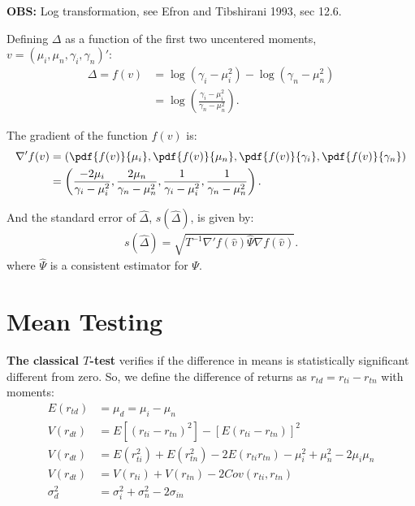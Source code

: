 \documentclass[12pt,oneside,a4paper]{article}
\begin{document}
\noindent
{\footnotesize
\textbf{OBS:} Log transformation, see Efron and Tibshirani 1993, sec 12.6.}
\vspace{1 em}

Defining $\Delta$ as a function of the first two uncentered moments, $v = (\mu_{i}, \mu_{n}, \gamma_{i}, \gamma_{n})'$:
\begin{align*}
\Delta = f(v) &=
\log{(\gamma_{i} - \mu^2_{i})} - \log{(\gamma_{n} - \mu^2_{n})} \\ &=
\log\left( {\frac{\gamma_{i} - \mu^2_{i}}{\gamma_{n} - \mu^2_{n}}} \right).
\end{align*}

The gradient of the function $f(v)$ is:
\begin{align}
\nabla' f(v) &=
\left( 
\pdf{f(v)}{\mu_{i}},
\pdf{f(v)}{\mu_{n}},
\pdf{f(v)}{\gamma_{i}},
\pdf{f(v)}{\gamma_{n}}
\right)
\\ &=
\left( 
\frac{-2 \mu_{i}}{\gamma_{i} - \mu_{i}^2},
\frac{2 \mu_{n}}{\gamma_{n} - \mu_{n}^2},
\frac{1}{\gamma_{i} - \mu_{i}^2},  
\frac{1}{\gamma_{n} - \mu_{n}^2}
\right).
\end{align}

And the standard error of $\hat{\Delta}$, $s(\hat{\Delta})$, is given by:
\begin{align}
	s(\hat{\Delta}) = \sqrt{T^{-1} \nabla'f(\hat{v}) \hat{\Psi} \nabla f(\hat{v})}.
\end{align}
where $\hat{\Psi}$ is a consistent estimator for $\Psi$.



\clearpage
\section{Mean Testing}

\textbf{The classical $T$-test} 
verifies if the difference in means is statistically significant different from zero.
So, we define the difference of returns as $r_{td} = r_{ti} - r_{tn}$ with moments:
\begin{align*}
E(r_{td}) &= \mu_{d} = \mu_{i} - \mu_{n} 
	\\
V(r_{dt})&= E[(r_{ti} - r_{tn})^2] - [E(r_{ti} - r_{tn})]^2
\\
V(r_{dt})&= E(r^2_{ti}) + E(r^2_{tn}) - 2E(r_{ti}r_{tn}) - \mu_{i}^2 + \mu_{n}^2 - 2\mu_{i}\mu_{n}
\\
V(r_{dt}) &= V(r_{ti}) + V(r_{tn}) - 2Cov(r_{ti},r_{tn}) 
\\
\sigma^2_{d} &= \sigma^2_{i} + \sigma^2_{n} - 2\sigma_{in}
\end{align*}
\end{document}
